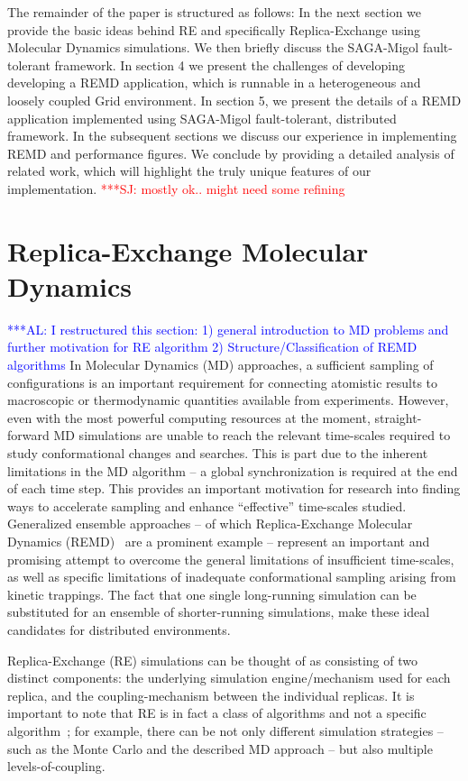 \documentclass{rspublic}
\newcommand{\alnote}[1]{ {\textcolor{blue} { ***AL: #1 }}}
\newcommand{\jhanote}[1]{ {\textcolor{red} { ***SJ: #1 }}}
\newcommand{\alnote}[1]{}
\newcommand{\jhanote}[1]{}
\begin{document}
The remainder of the paper is structured as follows: In the next
section we provide the basic ideas behind RE and specifically
Replica-Exchange using Molecular Dynamics simulations.  We then
briefly discuss the SAGA-Migol fault-tolerant framework. In section 4
we present the challenges of developing developing a REMD application,
which is runnable in a heterogeneous and loosely coupled Grid
environment.  In section 5, we present the details of a REMD
application implemented using SAGA-Migol fault-tolerant, distributed
framework. In the subsequent sections we discuss our experience in
implementing REMD and performance figures. We conclude by providing a
detailed analysis of related work, which will highlight the truly
unique features of our implementation.  \jhanote{mostly ok.. might
  need some refining}

\section{Replica-Exchange Molecular Dynamics}
\alnote{I restructured this section: 1) general introduction to MD
  problems and further motivation for RE algorithm 2)
  Structure/Classification of REMD algorithms}  In Molecular
Dynamics (MD) approaches, a sufficient sampling of configurations is
an important requirement for connecting atomistic results to
macroscopic or thermodynamic quantities available from experiments.
However, even with the most powerful computing resources at the
moment, straight-forward MD simulations are unable to reach the
relevant time-scales required to study conformational changes and
searches. This is part due to the inherent limitations in the MD
algorithm -- a global synchronization is required at the end of each
time step.  This provides an important motivation for research into
finding ways to accelerate sampling and enhance ``effective''
time-scales studied. Generalized ensemble approaches -- of which
Replica-Exchange Molecular Dynamics (REMD)~\citep{Sugita:1999rm} are a
prominent example -- represent an important and promising attempt to
overcome the general limitations of insufficient time-scales, as well
as specific limitations of inadequate conformational sampling arising
from kinetic trappings.  The fact that one single long-running
simulation can be substituted for an ensemble of shorter-running
simulations, make these ideal candidates for distributed environments.

Replica-Exchange (RE) simulations can be thought of as consisting of
two distinct components: the underlying simulation engine/mechanism
used for each replica, and the coupling-mechanism between the
individual replicas.  It is important to note that RE is in fact a
class of algorithms and not a specific
algorithm~\citep{dpa-paper}; for example, there can be not only
different simulation strategies -- such as the Monte Carlo and the
described MD approach -- but also multiple levels-of-coupling.  
\end{document}
